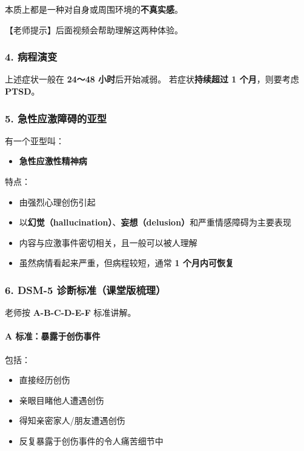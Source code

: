 \documentclass[
  chinese,
  9pt,
  a4paper,
]{ctexart}
\providecommand{\tightlist}{%
  \setlength{\itemsep}{0pt}\setlength{\parskip}{0pt}}
\begin{document}
本质上都是一种对自身或周围环境的\textbf{不真实感}。

【老师提示】后面视频会帮助理解这两种体验。

\subsubsection{4. 病程演变}\label{ux75c5ux7a0bux6f14ux53d8}

上述症状一般在 \textbf{24～48 小时}后开始减弱。 若症状\textbf{持续超过 1
个月}，则要考虑 \textbf{PTSD}。

\subsubsection{5.
急性应激障碍的亚型}\label{ux6025ux6027ux5e94ux6fc0ux969cux788dux7684ux4e9aux578b}

有一个亚型叫：

\begin{itemize}
\tightlist
\item
  \textbf{急性应激性精神病}
\end{itemize}

特点：

\begin{itemize}
\tightlist
\item
  由强烈心理创伤引起
\item
  以\textbf{幻觉（hallucination）}、\textbf{妄想（delusion）}和严重情感障碍为主要表现
\item
  内容与应激事件密切相关，且一般可以被人理解
\item
  虽然病情看起来严重，但病程较短，通常 \textbf{1 个月内可恢复}
\end{itemize}

\subsubsection{6. DSM-5
诊断标准（课堂版梳理）}\label{dsm-5-ux8bcaux65adux6807ux51c6ux8bfeux5802ux7248ux68b3ux7406}

老师按 \textbf{A-B-C-D-E-F} 标准讲解。

\paragraph{A
标准：暴露于创伤事件}\label{a-ux6807ux51c6ux66b4ux9732ux4e8eux521bux4f24ux4e8bux4ef6}

包括：

\begin{itemize}
\tightlist
\item
  直接经历创伤
\item
  亲眼目睹他人遭遇创伤
\item
  得知亲密家人/朋友遭遇创伤
\item
  反复暴露于创伤事件的令人痛苦细节中
\end{itemize}
\end{document}
